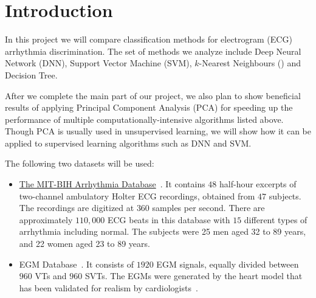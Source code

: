 \section{Introduction}
\label{sec:intro}
In this project we will compare classification methods for 
electrogram (ECG) arrhythmia discrimination. The set of methods we 
analyze include Deep Neural Network (DNN), Support Vector Machine 
(SVM), $k$-Nearest Neighbours (\knn) and Decision Tree.

After we complete the main part of our project,
 we also plan to show  beneficial results of applying Principal 
 Component 
 Analysis (PCA) for speeding up the performance of multiple 
 computationally-intensive algorithms listed above. Though PCA is 
 usually used in unsupervised learning, we will show how it can be 
 applied to supervised learning algorithms such as DNN and SVM.  

The following two datasets will be used: 
\begin{itemize}
	\item \href{https://physionet.org/physiobank/database/mitdb/}{The 
	MIT-BIH Arrhythmia Database}~\cite{moody2001impact}. 
	It contains $48$ half-hour excerpts of two-channel ambulatory 
	Holter ECG recordings, obtained from $47$ subjects. The 
	recordings are digitized at $360$ samples per second. 
	There are approximately $110,000$ ECG
	beats in this database with $15$ different types of arrhythmia 
	including normal.
	The subjects were 25 men aged 32 to 89 years, and 22 women aged 
	23 to 89 years.
	\item EGM Database~\cite{jiang2016silico}. It consists
	of $1920$ EGM signals, equally divided between $960$ VTs and
	$960$ SVTs. The EGMs were generated by the heart
	model that has been validated for realism by 
	cardiologists~\cite{jiang2016silico}.
\end{itemize}
